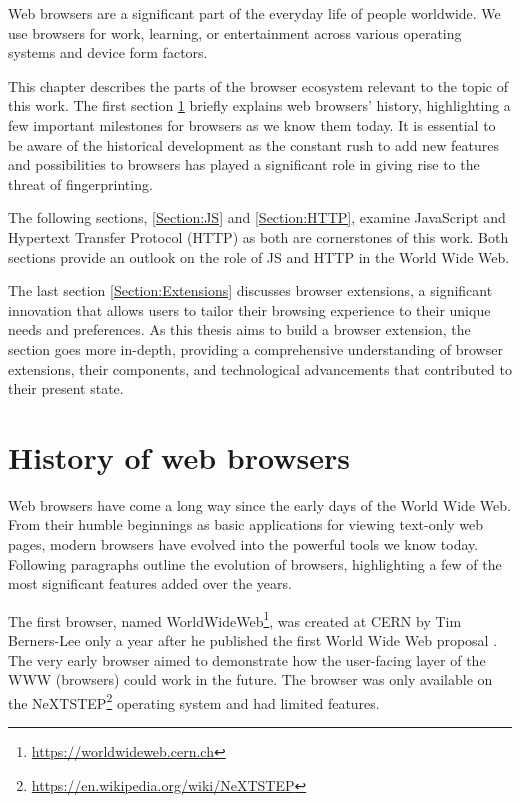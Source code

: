Web browsers are a significant part of the everyday life of people worldwide. We use browsers for work, learning, or entertainment across various operating systems and device form factors.

This chapter describes the parts of the browser ecosystem relevant to the topic of this work. The first section \ref{Section:BrowsersHistory} briefly explains web browsers' history, highlighting a few important milestones for browsers as we know them today. It is essential to be aware of the historical development as the constant rush to add new features and possibilities to browsers has played a significant role in giving rise to the threat of fingerprinting.

The following sections, \ref{Section:JS} and \ref{Section:HTTP}, examine JavaScript and Hypertext Transfer Protocol (HTTP) as both are cornerstones of this work. Both sections provide an outlook on the role of JS and HTTP in the World Wide Web.

The last section \ref{Section:Extensions} discusses browser extensions, a significant innovation that allows users to tailor their browsing experience to their unique needs and preferences. As this thesis aims to build a browser extension, the section goes more in-depth, providing a comprehensive understanding of browser extensions, their components, and technological advancements that contributed to their present state.

\section{History of web browsers}
\label{Section:BrowsersHistory}

Web browsers have come a long way since the early days of the World Wide Web. From their humble beginnings as basic applications for viewing text-only web pages, modern browsers have evolved into the powerful tools we know today. Following paragraphs outline the evolution of browsers, highlighting a few of the most significant features added over the years.

The first browser, named WorldWideWeb\footnote{\url{https://worldwideweb.cern.ch}}, was created at CERN by Tim Berners-Lee only a year after he published the first World Wide Web proposal \cite{WWWProposal}. The very early browser aimed to demonstrate how the user-facing layer of the WWW (browsers) could work in the future. The browser was only available on the NeXTSTEP\footnote{\url{https://en.wikipedia.org/wiki/NeXTSTEP}} operating system and had limited features.

